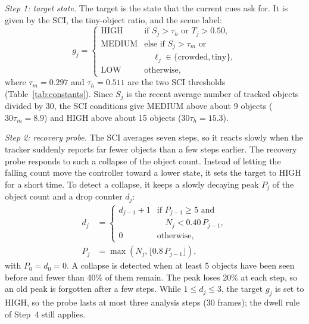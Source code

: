 \documentclass[journal]{new-aiaa}
\begin{document}
\emph{Step 1: target state.} The target is the state that the current cues
ask for. It is given by the SCI, the tiny-object ratio, and the scene label:
\begin{equation}
g_j=\begin{cases}
\text{HIGH}   & \text{if } S_j>\tau_h \text{ or } T_j>0.50,\\
\text{MEDIUM} & \text{else if } S_j>\tau_m \text{ or}\\
              & \quad \ell_j\in\{\text{crowded},\text{tiny}\},\\
\text{LOW}    & \text{otherwise,}
\end{cases}
\label{eq:target}
\end{equation}
where $\tau_m=0.297$ and $\tau_h=0.511$ are the two SCI thresholds
(Table~\ref{tab:constants}). Since $S_j$ is the
recent average number of tracked objects divided by 30, the SCI conditions
give MEDIUM above about 9 objects ($30\tau_m=8.9$) and HIGH above about 15
objects ($30\tau_h=15.3$).

\emph{Step 2: recovery probe.} The SCI averages seven steps, so it reacts
slowly when the tracker suddenly reports far fewer objects than a few steps
earlier. The recovery probe responds to such a collapse of the object count.
Instead of letting the falling count move the controller toward a lower
state, it sets the target to HIGH for a short time. To detect a collapse, it
keeps a slowly decaying peak $P_j$ of the object count and a drop counter
$d_j$:
\begin{align}
d_j&=\begin{cases}
d_{j-1}+1 & \text{if } P_{j-1}\ge5 \text{ and}\\
          & \quad N_j<0.40\,P_{j-1},\\
0         & \text{otherwise,}
\end{cases}\label{eq:drop}\\
P_j&=\max\left(N_j,\lfloor 0.8\,P_{j-1}\rfloor\right),\label{eq:peak}
\end{align}
with $P_0=d_0=0$. A collapse is detected when at least 5 objects have been seen
before and fewer than 40\% of them remain. The peak loses 20\% at each step,
so an old peak is forgotten after a few steps. While $1\le d_j\le3$, the
target $g_j$ is set to HIGH, so the probe lasts at most three analysis steps
(30 frames); the dwell rule of Step~4 still applies.
\end{document}
